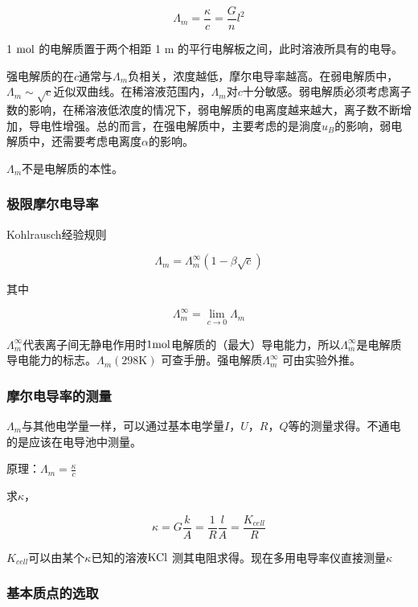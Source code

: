     \[
        \varLambda_m = \frac{\kappa}{c} = \frac{G}{n}l^2  
    \]

    1 $\mathrm{mol}$ 的电解质置于两个相距 1 $\mathrm{m}$ 的平行电解板之间，此时溶液所具有的电导。

    强电解质的在$c$通常与$\varLambda_m$负相关，浓度越低，摩尔电导率越高。在弱电解质中，$\varLambda_m \sim \sqrt{c}$近似双曲线。在稀溶液范围内，$\varLambda_m$对$c$十分敏感。弱电解质必须考虑离子数的影响，在稀溶液低浓度的情况下，弱电解质的电离度越来越大，离子数不断增加，导电性增强。总的而言，在强电解质中，主要考虑的是淌度$u_B$的影响，弱电解质中，还需要考虑电离度$\alpha$的影响。

    $\varLambda_m$不是电解质的本性。

    \subsubsection{极限摩尔电导率}

    Kohlrausch经验规则

    \[
        \varLambda_m = \varLambda_m^\infty (1 - \beta \sqrt{c})
    \]

    其中

    \[
        \varLambda_m^\infty = \lim_{c \rightarrow 0} \varLambda_m   
    \]

    $\varLambda_m^\infty$代表离子间无静电作用时$1 \mathrm{mol}$电解质的（最大）导电能力，所以$\Lambda_m ^\infty$是电解质导电能力的标志。$\varLambda_m (298\mathrm{K})$ 可查手册。强电解质$\varLambda_m^\infty$ 可由实验外推。

    \subsubsection{摩尔电导率的测量}

    $\varLambda_m$与其他电学量一样，可以通过基本电学量$I$，$U$，$R$，$Q$等的测量求得。不通电的是应该在电导池中测量。

    原理：$\varLambda_m = \frac{\kappa}{c} $

    求$\kappa$，
    
    \[
        \kappa = G \frac{k}{A} = \frac{1}{R} \frac{l}{A} = \frac{K_{cell}}{R}  
    \]

    $K_{cell}$可以由某个$\kappa$已知的溶液$\ce{KCl}$ 测其电阻求得。现在多用电导率仪直接测量$\kappa$

    \subsubsection{基本质点的选取}

